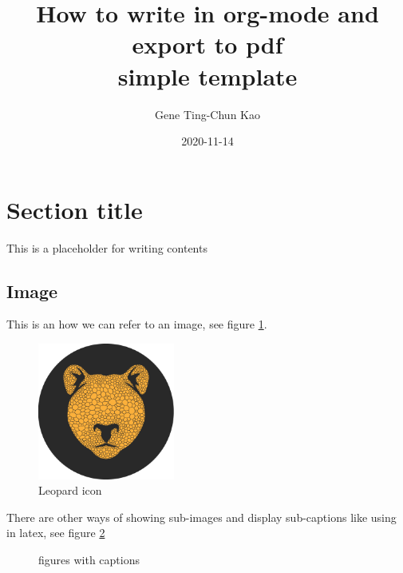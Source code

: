 \documentclass[a4paper,11pt]{article}
\author{Gene Ting-Chun Kao}
\date{2020-11-14}
\title{How to write in org-mode and export to pdf\\\medskip
\large simple template}
\begin{document}
\maketitle


\section*{Section title}
\label{sec:orgaf37fc6}

This is a placeholder for writing contents


\subsection*{Image}
\label{sec:org5e36c51}

This is an how we can refer to an image, see figure \ref{fig:org0621bba}.

\begin{figure}[htbp]
\centering
\includegraphics[width=0.4\textwidth]{./images/Leopard-ICON-circle.png}
\caption{\label{fig:org0621bba}
Leopard icon}
\end{figure}

There are other ways of showing sub-images and display sub-captions like using in latex,
see figure \ref{orga4b87b2}

\begin{figure}
    \centering
\caption{\label{orga4b87b2}
figures with captions}
\end{figure}
\end{document}
